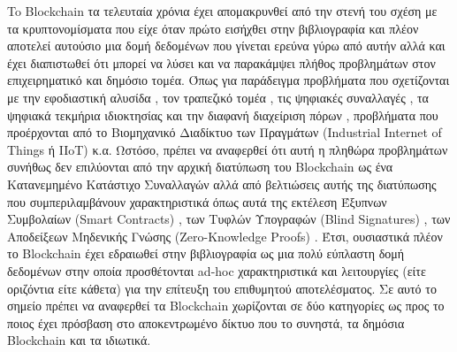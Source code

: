 To Blockchain τα τελευταία χρόνια έχει απομακρυνθεί από την στενή του σχέση με τα κρυπτονομίσματα που είχε όταν πρώτο εισήχθει στην βιβλιογραφία και πλέον αποτελεί αυτούσιο μια δομή δεδομένων που γίνεται ερεύνα γύρω από αυτήν αλλά και έχει διαπιστωθεί ότι μπορεί να λύσει και να παρακάμψει πλήθος προβλημάτων στον επιχειρηματικό και δημόσιο τομέα. Όπως για παράδειγμα προβλήματα που σχετίζονται με την εφοδιαστική αλυσίδα , τον τραπεζικό τομέα , τις ψηφιακές συναλλαγές , τα ψηφιακά τεκμήρια ιδιοκτησίας  και την διαφανή διαχείριση πόρων , προβλήματα που προέρχονται από το Βιομηχανικό Διαδίκτυο των Πραγμάτων (Industrial Internet of Things ή IIoT) κ.α. Ωστόσο, πρέπει να αναφερθεί ότι αυτή η πληθώρα προβλημάτων συνήθως δεν επιλύονται από την αρχική διατύπωση του Blockchain ως ένα Κατανεμημένο Κατάστιχο Συναλλαγών αλλά από βελτιώσεις αυτής της διατύπωσης που συμπεριλαμβάνουν χαρακτηριστικά όπως αυτά της εκτέλεση Έξυπνων Συμβολαίων (Smart Contracts) , των Τυφλών Υπογραφών (Blind Signatures) , των Αποδείξεων Μηδενικής Γνώσης (Zero-Knowledge Proofs) . Έτσι, ουσιαστικά πλέον το Blockchain έχει εδραιωθεί στην βιβλιογραφία ως μια πολύ εύπλαστη δομή δεδομένων στην οποία προσθέτονται ad-hoc χαρακτηριστικά και λειτουργίες (είτε οριζόντια είτε κάθετα) για την επίτευξη του επιθυμητού αποτελέσματος. Σε αυτό το σημείο πρέπει να αναφερθεί τα Blockchain χωρίζονται σε δύο κατηγορίες ως προς το ποιος έχει πρόσβαση στο αποκεντρωμένο δίκτυο που το συνηστά, τα δημόσια Blockchain και τα ιδιωτικά.
